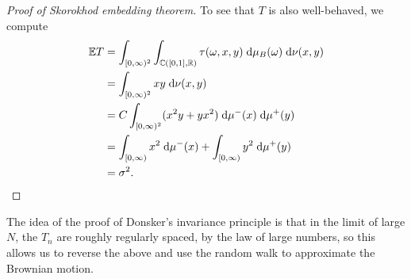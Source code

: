 \documentclass[a4paper]{article}
\begin{document}
\begin{proof}[Proof of Skorokhod embedding theorem]
  To see that $T$ is also well-behaved, we compute
  \begin{align*}
    \mathbb{E} T &= \int_{[0, \infty)^2} \int_{\mathbb{C}([0, 1], \mathbb{R})} \tau(\omega, x, y)\;\mathrm{d} \mu_B(\omega)\;\mathrm{d} \nu(x, y)\\
     &= \int_{[0, \infty)^2} xy \;\mathrm{d} \nu(x, y)\\
     &= C \int_{[0, \infty)^2} (x^2 y + yx^2)\;\mathrm{d} \mu^-(x) \;\mathrm{d} \mu^+(y)\\
     &= \int_{[0, \infty)} x^2 \;\mathrm{d} \mu^-(x) + \int_{[0, \infty)} y^2 \;\mathrm{d} \mu^+(y)\\
     &= \sigma^2.\qedhere
  \end{align*}
\end{proof}

The idea of the proof of Donsker's invariance principle is that in the limit of large $N$, the $T_n$ are roughly regularly spaced, by the law of large numbers, so this allows us to reverse the above and use the random walk to approximate the Brownian motion.
\end{document}
